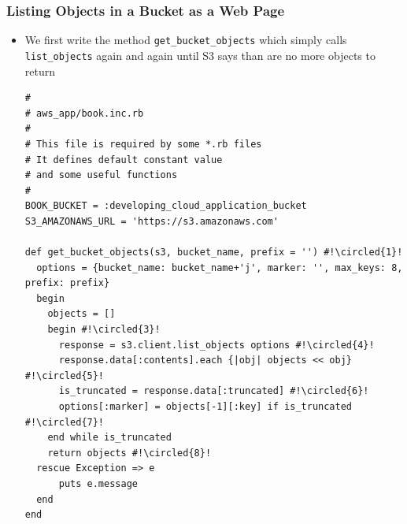 \documentclass{beamer}
\newcommand*\circled[1]{\tikz[baseline=(char.base)]{
            \node[shape=circle,draw,inner sep=2pt] (char) {#1};}}
\begin{document}
\begin{frame}
\frametitle{Listing Objects in a Bucket as a Web Page}
\begin{itemize}
 \item We first write the method \texttt{get\_bucket\_objects} which simply calls \texttt{list\_objects} again and again until S3 says than are no more objects to return

\lstset{language=Ruby, style=eclipse}
\begin{lstlisting}[escapechar=!]
#
# aws_app/book.inc.rb
#
# This file is required by some *.rb files
# It defines default constant value
# and some useful functions
#
BOOK_BUCKET = :developing_cloud_application_bucket
S3_AMAZONAWS_URL = 'https://s3.amazonaws.com'

def get_bucket_objects(s3, bucket_name, prefix = '') #!\circled{1}!
  options = {bucket_name: bucket_name+'j', marker: '', max_keys: 8, prefix: prefix}
  begin
    objects = []
    begin #!\circled{3}!
      response = s3.client.list_objects options #!\circled{4}!
      response.data[:contents].each {|obj| objects << obj} #!\circled{5}!
      is_truncated = response.data[:truncated] #!\circled{6}!
      options[:marker] = objects[-1][:key] if is_truncated #!\circled{7}!
    end while is_truncated
    return objects #!\circled{8}!
  rescue Exception => e
      puts e.message
  end
end
\end{lstlisting}


\end{itemize}
\end{frame}
\end{document}
